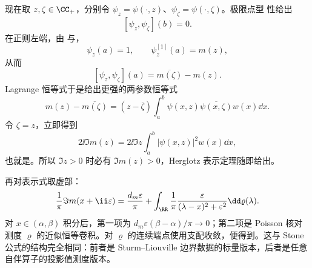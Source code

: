 现在取 $z,\zeta\in\CC_+$，分别令 $\psi_z=\psi(\cdot,z)$、$\psi_\zeta=\psi(\cdot,\zeta)$。极限点型 性给出
\[
 [\psi_z,\psi_\zeta](b)=0.
\]
在正则左端，由 与，
\[
 \psi_z(a)=1,
 \qquad
 \psi_z^{[1]}(a)=m(z),
\]
从而
\[
 [\psi_z,\psi_\zeta](a)
 =\overline{m(\zeta)}-m(z).
\]
Lagrange 恒等式于是给出更强的两参数恒等式
\[
 m(z)-\overline{m(\zeta)}
 =(z-\overline\zeta)
 \int_a^b\psi(x,z)\overline{\psi(x,\zeta)}w(x)\dd x.
\]
令 $\zeta=z$，立即得到
\[
 2\ii\Im m(z)
 =2\ii\Im z
 \int_a^b|\psi(x,z)|^2w(x)\dd x,
\]
也就是。所以 $\Im z>0$ 时必有 $\Im m(z)>0$，Herglotz 表示定理随即给出。

再对表示式取虚部：
\[
 \frac{1}{\pi}\Im m(x+\ii\varepsilon)
 =\frac{d_m\varepsilon}{\pi}
 +\int_{\RR}
 \frac{1}{\pi}
 \frac{\varepsilon}{(\lambda-x)^2+\varepsilon^2}
 \dd\varrho(\lambda).
\]
对 $x\in(\alpha,\beta)$ 积分后，第一项为 $d_m\varepsilon(\beta-\alpha)/\pi\to0$；第二项是 Poisson 核对测度 $\varrho$ 的近似恒等卷积。对 $\varrho$ 的连续端点使用支配收敛，便得到。这与 Stone 公式的结构完全相同：前者是 Sturm--Liouville 边界数据的标量版本，后者是任意自伴算子的投影值测度版本。

